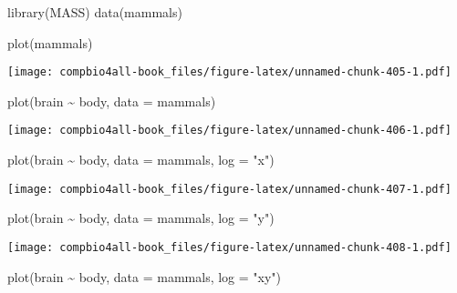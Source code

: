 \documentclass[
]{book}
\newenvironment{Shaded}{\begin{snugshade}}{\end{snugshade}}
\newcommand{\AttributeTok}[1]{\textcolor[rgb]{0.77,0.63,0.00}{#1}}
\newcommand{\FunctionTok}[1]{\textcolor[rgb]{0.00,0.00,0.00}{#1}}
\newcommand{\NormalTok}[1]{#1}
\newcommand{\SpecialCharTok}[1]{\textcolor[rgb]{0.00,0.00,0.00}{#1}}
\newcommand{\StringTok}[1]{\textcolor[rgb]{0.31,0.60,0.02}{#1}}
\begin{document}
\begin{Shaded}
\begin{Highlighting}[]
\FunctionTok{library}\NormalTok{(MASS)}
\FunctionTok{data}\NormalTok{(mammals)}
\end{Highlighting}
\end{Shaded}

\begin{Shaded}
\begin{Highlighting}[]
\FunctionTok{plot}\NormalTok{(mammals)}
\end{Highlighting}
\end{Shaded}

\texttt{[image: compbio4all-book\_files/figure-latex/unnamed-chunk-405-1.pdf]}

\begin{Shaded}
\begin{Highlighting}[]
\FunctionTok{plot}\NormalTok{(brain }\SpecialCharTok{\textasciitilde{}}\NormalTok{ body, }\AttributeTok{data =}\NormalTok{ mammals)}
\end{Highlighting}
\end{Shaded}

\texttt{[image: compbio4all-book\_files/figure-latex/unnamed-chunk-406-1.pdf]}

\begin{Shaded}
\begin{Highlighting}[]
\FunctionTok{plot}\NormalTok{(brain }\SpecialCharTok{\textasciitilde{}}\NormalTok{ body, }\AttributeTok{data =}\NormalTok{ mammals, }\AttributeTok{log =} \StringTok{"x"}\NormalTok{)}
\end{Highlighting}
\end{Shaded}

\texttt{[image: compbio4all-book\_files/figure-latex/unnamed-chunk-407-1.pdf]}

\begin{Shaded}
\begin{Highlighting}[]
\FunctionTok{plot}\NormalTok{(brain }\SpecialCharTok{\textasciitilde{}}\NormalTok{ body, }\AttributeTok{data =}\NormalTok{ mammals, }\AttributeTok{log =} \StringTok{"y"}\NormalTok{)}
\end{Highlighting}
\end{Shaded}

\texttt{[image: compbio4all-book\_files/figure-latex/unnamed-chunk-408-1.pdf]}

\begin{Shaded}
\begin{Highlighting}[]
\FunctionTok{plot}\NormalTok{(brain }\SpecialCharTok{\textasciitilde{}}\NormalTok{ body, }\AttributeTok{data =}\NormalTok{ mammals, }\AttributeTok{log =} \StringTok{"xy"}\NormalTok{)}
\end{Highlighting}
\end{Shaded}
\end{document}
